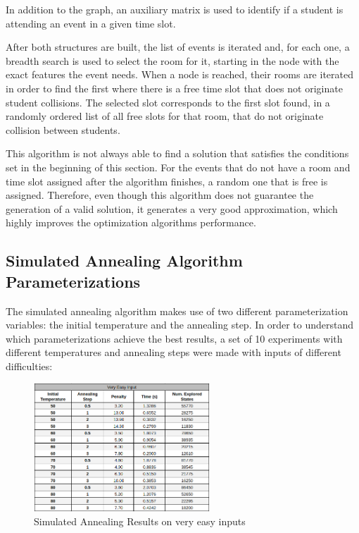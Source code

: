 \documentclass[conference]{IEEEtran}
\begin{document}
In addition to the graph, an auxiliary matrix is used to identify if a student is attending an event in a given time slot.

After both structures are built, the list of events is iterated and, for each one, a breadth search is used to select the room for it, starting in the node with the exact features the event needs. When a node is reached, their rooms are iterated in order to find the first where there is a free time slot that does not originate student collisions. The selected slot corresponds to the first slot found, in a randomly ordered list of all free slots for that room, that do not originate collision between students.

This algorithm is not always able to find a solution that satisfies the conditions set in the beginning of this section. For the events that do not have a room and time slot assigned after the algorithm finishes, a random one that is free is assigned. Therefore, even though this algorithm does not guarantee the generation of a valid solution, it generates a very good approximation, which highly improves the optimization algorithms performance.

\subsection{Simulated Annealing Algorithm Parameterizations}

The simulated annealing algorithm makes use of two different parameterization variables: the initial temperature and the annealing step. In order to understand which parameterizations achieve the best results, a set of 10 experiments with different temperatures and annealing steps were made with inputs of different difficulties:

\begin{figure}[H]
    \centerline{\includegraphics[width=250px]{annealing_very_easy.png}}
    \caption{Simulated Annealing Results on very easy inputs}
\end{figure}
\end{document}
